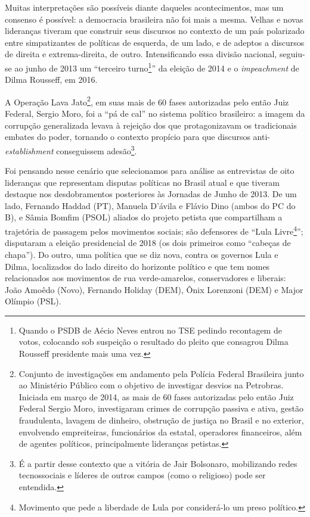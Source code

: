 Muitas interpretações são possíveis diante daqueles acontecimentos, mas
um consenso é possível: a democracia brasileira não foi mais a mesma.
Velhas e novas lideranças tiveram que construir seus discursos no
contexto de um país polarizado entre simpatizantes de políticas de
esquerda, de um lado, e de adeptos a discursos de direita e
extrema-direita, de outro. Intensificando essa divisão nacional,
seguiu-se ao junho de 2013 um ``terceiro turno\footnote{Quando o PSDB de
  Aécio Neves entrou no TSE pedindo recontagem de votos, colocando sob
  suspeição o resultado do pleito que consagrou Dilma Rousseff
  presidente mais uma vez.}'' da eleição de 2014 e o \emph{impeachment}
de Dilma Rousseff, em 2016.

A Operação Lava Jato\footnote{Conjunto de investigações em andamento
  pela Polícia Federal Brasileira junto ao Ministério Público com o
  objetivo de investigar desvios na Petrobras. Iniciada em março de
  2014, as mais de 60 fases autorizadas pelo então Juiz Federal Sergio
  Moro, investigaram crimes de corrupção passiva e ativa, gestão
  fraudulenta, lavagem de dinheiro, obstrução de justiça no Brasil e no
  exterior, envolvendo empreiteiras, funcionários da estatal, operadores
  financeiros, além de agentes políticos, principalmente lideranças
  petistas.}, em suas mais de 60 fases autorizadas pelo então Juiz
Federal, Sergio Moro, foi a ``pá de cal'' no sistema político
brasileiro: a imagem da corrupção generalizada levava à rejeição dos que
protagonizavam os tradicionais embates do poder, tornando o contexto
propício para que discursos anti-\emph{establishment} conseguissem
adesão\footnote{É a partir desse contexto que a vitória de Jair
  Bolsonaro, mobilizando redes tecnossociais e líderes de outros campos
  (como o religioso) pode ser entendida.}.

Foi pensando nesse cenário que selecionamos para análise as entrevistas
de oito lideranças que representam disputas políticas no Brasil atual e
que tiveram destaque nos desdobramentos posteriores às Jornadas de Junho
de 2013. De um lado, Fernando Haddad (PT), Manuela D'ávila e Flávio Dino
(ambos do PC do B), e Sâmia Bomfim (PSOL) aliados do projeto petista que
compartilham a trajetória de passagem pelos movimentos sociais; são
defensores de ``Lula Livre\footnote{Movimento que pede a liberdade de
  Lula por considerá-lo um preso político.}''; disputaram a eleição
presidencial de 2018 (os dois primeiros como ``cabeças de chapa''). Do
outro, uma política que se diz nova, contra os governos Lula e Dilma,
localizados do lado direito do horizonte político e que tem nomes
relacionados aos movimentos de rua verde-amarelos, conservadores e
liberais: João Amoêdo (Novo), Fernando Holiday (DEM), Ônix Lorenzoni
(DEM) e Major Olímpio (PSL).

